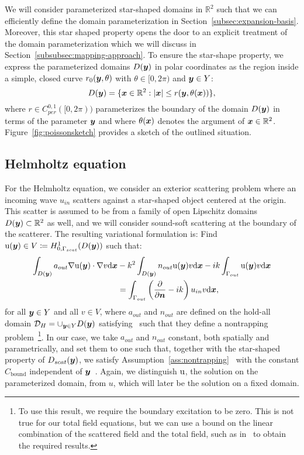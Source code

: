 We will consider parameterized star-shaped domains in $\mathbb{R}^2$ such that we can efficiently define the domain parameterization in Section~\ref{subsec:expansion-basis}.
Moreover, this star shaped property opens the door to an explicit treatment of the domain parameterization which we will discuss in Section~\ref{subsubsec:mapping-approach}.
To ensure the star-shape property, we express the parameterized domains ${D}({\bm{y}})$ in polar coordinates as the region inside a simple, closed curve $r_0({\bm{y}},\theta)$ with $\theta\in[0,2\pi)$ and ${\bm{y}}\in Y$:
\begin{equation}
    {D}({\bm{y}}) = \{ {{\bm{x}}} \in \mathbb{R}^2: |{{\bm{x}}}| \leq r({\bm{y}},\theta({{\bm{x}}})) \},\label{eq:starshapepossiondomain}
\end{equation}
where $r \in C^{0, 1}_{per}([0, 2\pi))$ parameterizes the boundary of the domain ${D}({\bm{y}})$ in terms of the parameter ${\bm{y}}$ and where $\theta({{\bm{x}}})$ denotes the argument of ${{\bm{x}}}\in\mathbb{R}^2$.
Figure~\ref{fig:poissonsketch} provides a sketch of the outlined situation.


\subsection{Helmholtz equation}\label{subsec:helmholtz-shape}
For the Helmholtz equation, we consider an exterior scattering problem where an incoming wave $u_{in}$ scatters against a star-shaped object centered at the origin.
This scatter is assumed to be from a family of open Lipschitz domains ${D}({\bm{y}})\subset \mathbb{R}^2$ as well, and we will consider sound-soft scattering at the boundary of the scatterer.
The resulting variational formulation is:
Find $\mathrm{u}({\bm{y}}) \in V\coloneqq H^1_{0, \Gamma_{scat}}({D}({\bm{y}}))$ such that:
\begin{align}
    \int_{{D}({\bm{y}})} a_{out}\nabla \mathrm{u}({\bm{y}}) \cdot \nabla v \mathrm{d}{{\bm{x}}} &-k^2\int_{{D}({\bm{y}})} n_{out}  \mathrm{u}({\bm{y}}) v \mathrm{d}{{\bm{x}}} -ik\int_{\Gamma_{out}} \mathrm{u}({\bm{y}}) v \mathrm{d}{{\bm{x}}} \nonumber\\
    &= \int_{\Gamma_{out}} \left( \frac{\partial}{\partial\bm{n}} -ik\right) u_{in} v \mathrm{d}{{\bm{x}}},\label{eq:varformhelmholtz_shape}
\end{align}
for all ${\bm{y}} \in Y$ and all $v\in V$, where $a_{out}$ and $n_{out}$ are defined on the hold-all domain $\mathcal{D}_H=\cup_{{\bm{y}}\in Y}{D}({\bm{y}})$ satisfying~\cite[Assumption~2.4]{graham2019} such that they define a nontrapping problem~\cite[Theorem~2.5]{graham2019}\footnote{To use this result, we require the boundary excitation to be zero. This is not true for our total field equations, but we can use a bound on the linear combination of the scattered field and the total field, such as in~\cite[Corollary~1.6]{chaumont-frelet2023} to obtain the required results.}.
In our case, we take $a_{out}$ and $n_{out}$ constant, both spatially and parametrically, and set them to one such that, together with the star-shaped property of $D_{scat}({\bm{y}})$, we satisfy Assumption~\ref{ass:nontrapping}~\cite[Prop. 3.1, Chapter 5]{lax1989} with the constant $C_{\text{bound}}$ independent of ${\bm{y}}$~\cite{chandler-wilde2008}.
Again, we distinguish $\mathrm{u}$, the solution on the parameterized domain, from $u$, which will later be the solution on a fixed domain.

